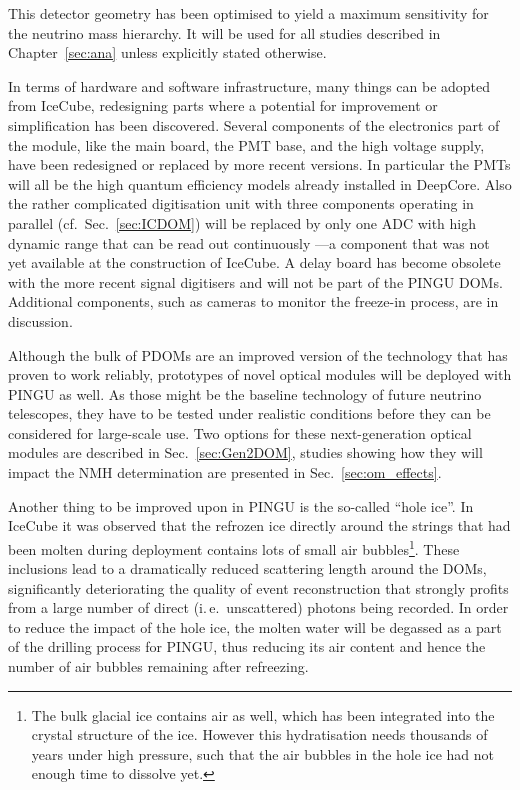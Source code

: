 This detector geometry has been optimised to yield a maximum sensitivity for 
the neutrino mass hierarchy. It will be used for all studies described in 
Chapter~\ref{sec:ana} unless explicitly stated otherwise.

In terms of hardware and software infrastructure, many things can be adopted 
from IceCube, redesigning parts where a potential for improvement or 
simplification has been discovered. Several components of the electronics part
of the module, like the main board, the PMT base, and the high voltage supply,
have been redesigned or replaced by more recent versions. In particular the PMTs
will all be the high quantum efficiency models already installed in DeepCore.
Also the rather complicated digitisation unit with three components operating
in parallel (cf.~Sec.~\ref{sec:ICDOM}) will be replaced by only one ADC with
high dynamic range that can be read out continuously \cite{PDOM_Aachen}---a
component that was not yet available at the construction of IceCube.
A delay board has become obsolete with the more recent signal digitisers and
will not be part of the PINGU DOMs. Additional components, such as cameras to
monitor the freeze-in process, are in discussion.

Although the bulk of PDOMs are an improved version of the technology that has 
proven to work reliably, prototypes of novel optical modules will be deployed 
with PINGU as well. As those might be the baseline technology of future 
neutrino telescopes, they have to be tested under realistic conditions before 
they can be considered for large-scale use. Two options for these 
next-generation optical modules are described in Sec.~\ref{sec:Gen2DOM}, 
studies showing how they will impact the NMH determination are presented in 
Sec.~\ref{sec:om_effects}.

Another thing to be improved upon in PINGU is the so-called ``hole ice''. In 
IceCube it was observed that the refrozen ice directly around the strings that 
had been molten during deployment contains lots of small air
bubbles\footnote{The bulk glacial ice contains air as well, which has been
integrated into the crystal structure of the ice. However this hydratisation
needs thousands of years under high pressure, such that the air bubbles in the
hole ice had not enough time to dissolve yet.}. These
inclusions lead to a dramatically reduced scattering length around the DOMs,
significantly deteriorating the quality of event reconstruction that strongly
profits from a large number of direct (i.\,e.\ unscattered) photons being
recorded. In order to reduce the impact of the hole ice, the molten water will
be degassed as a part of the drilling process for PINGU, thus reducing its air
content and hence the number of air bubbles remaining after refreezing.

